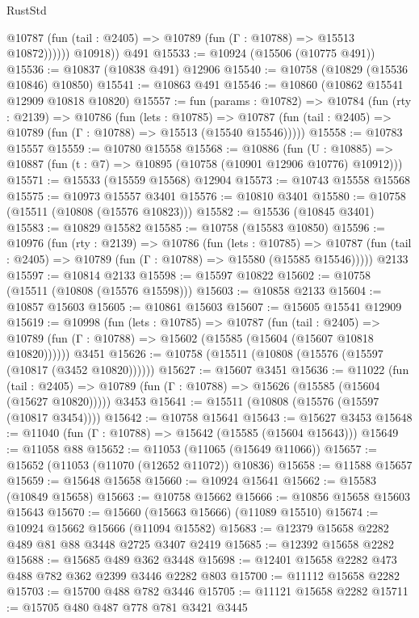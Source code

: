 \begin{lexlean}{RustStd}
\begin{coremodule}
              @10787 (fun (tail : @2405) => @10789 (fun (Γ : @10788) => @15513 @10872))))))
        @10918))
    @491
@15533 := @10924 (@15506 (@10775 @491))
@15536 := @10837 (@10838 @491) @12906
@15540 := @10758 (@10829 (@15536 @10846) @10850)
@15541 := @10863 @491
@15546 := @10860 (@10862 @15541 @12909 @10818 @10820)
@15557 := fun (params : @10782) =>
  @10784
    (fun (rty : @2139) =>
    @10786
      (fun (lets : @10785) =>
      @10787 (fun (tail : @2405) => @10789 (fun (Γ : @10788) => @15513 (@15540 @15546)))))
@15558 := @10783 @15557
@15559 := @10780 @15558
@15568 := @10886
    (fun (U : @10885) => @10887 (fun (t : @7) => @10895 (@10758 (@10901 @12906 @10776) @10912)))
@15571 := @15533 (@15559 @15568) @12904
@15573 := @10743 @15558 @15568
@15575 := @10973 @15557 @3401
@15576 := @10810 @3401
@15580 := @10758 (@15511 (@10808 (@15576 @10823)))
@15582 := @15536 (@10845 @3401)
@15583 := @10829 @15582
@15585 := @10758 (@15583 @10850)
@15596 := @10976
    (fun (rty : @2139) =>
    @10786
      (fun (lets : @10785) =>
      @10787 (fun (tail : @2405) => @10789 (fun (Γ : @10788) => @15580 (@15585 @15546)))))
    @2133
@15597 := @10814 @2133
@15598 := @15597 @10822
@15602 := @10758 (@15511 (@10808 (@15576 @15598)))
@15603 := @10858 @2133
@15604 := @10857 @15603
@15605 := @10861 @15603
@15607 := @15605 @15541 @12909
@15619 := @10998
    (fun (lets : @10785) =>
    @10787
      (fun (tail : @2405) =>
      @10789 (fun (Γ : @10788) => @15602 (@15585 (@15604 (@15607 @10818 @10820))))))
    @3451
@15626 := @10758 (@15511 (@10808 (@15576 (@15597 (@10817 (@3452 @10820))))))
@15627 := @15607 @3451
@15636 := @11022
    (fun (tail : @2405) => @10789 (fun (Γ : @10788) => @15626 (@15585 (@15604 (@15627 @10820)))))
    @3453
@15641 := @15511 (@10808 (@15576 (@15597 (@10817 @3454))))
@15642 := @10758 @15641
@15643 := @15627 @3453
@15648 := @11040 (fun (Γ : @10788) => @15642 (@15585 (@15604 @15643)))
@15649 := @11058 @88
@15652 := @11053 (@11065 (@15649 @11066))
@15657 := @15652 (@11053 (@11070 (@12652 @11072)) @10836)
@15658 := @11588 @15657
@15659 := @15648 @15658
@15660 := @10924 @15641
@15662 := @15583 (@10849 @15658)
@15663 := @10758 @15662
@15666 := @10856 @15658 @15603 @15643
@15670 := @15660 (@15663 @15666) (@11089 @15510)
@15674 := @10924 @15662 @15666 (@11094 @15582)
@15683 := @12379 @15658 @2282 @489 @81 @88 @3448 @2725 @3407 @2419
@15685 := @12392 @15658 @2282
@15688 := @15685 @489 @362 @3448
@15698 := @12401 @15658 @2282 @473 @488 @782 @362 @2399 @3446 @2282 @803
@15700 := @11112 @15658 @2282
@15703 := @15700 @488 @782 @3446
@15705 := @11121 @15658 @2282
@15711 := @15705 @480 @487 @778 @781 @3421 @3445

\end{coremodule}
\end{lexlean}
